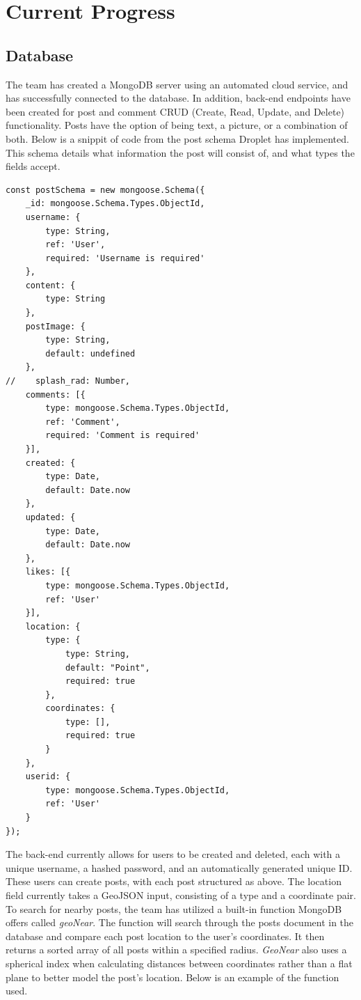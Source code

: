 \documentclass[draftclsnofoot, onecolumn, letterpaper,10pt,compsoc]{IEEEtran}
\begin{document}
\section{Current Progress}
\subsection{Database}
The team has created a MongoDB server using an automated cloud service, and has successfully connected to the database.  In addition, back-end endpoints have been created for post and comment CRUD (Create, Read, Update, and Delete) functionality.  Posts have the option of being text, a picture, or a combination of both.  Below is a snippit of code from the post schema Droplet has implemented.  This schema details what information the post will consist of, and what types the fields accept.
\small{
\begin{lstlisting}[caption=Post Schema]
const postSchema = new mongoose.Schema({
    _id: mongoose.Schema.Types.ObjectId,
    username: {
        type: String,
        ref: 'User',
        required: 'Username is required'
    },
    content: {
        type: String
    },
    postImage: {
        type: String,
        default: undefined
    },
//    splash_rad: Number,
    comments: [{
        type: mongoose.Schema.Types.ObjectId,
        ref: 'Comment',
        required: 'Comment is required'
    }],
    created: {
        type: Date,
        default: Date.now
    },
    updated: {
        type: Date,
        default: Date.now
    },
    likes: [{
        type: mongoose.Schema.Types.ObjectId,
        ref: 'User'
    }],
    location: {
        type: {
            type: String,
            default: "Point",
            required: true
        },
        coordinates: {
            type: [],
            required: true
        }
    },
    userid: {
        type: mongoose.Schema.Types.ObjectId,
        ref: 'User'
    }
});
\end{lstlisting}
}
The back-end currently allows for users to be created and deleted, each with a unique username, a hashed password, and an automatically generated unique ID.  These users can create posts, with each post structured as above.  The location field currently takes a GeoJSON input, consisting of a type and a coordinate pair.  To search for nearby posts, the team has utilized a built-in function MongoDB offers called \textit{geoNear}.  The function will search through the posts document in the database and compare each post location to the user's coordinates.  It then returns a sorted array of all posts within a specified radius.  \textit{GeoNear} also uses a spherical index when calculating distances between coordinates rather than a flat plane to better model the post's location.  Below is an example of the function used.
\end{document}
